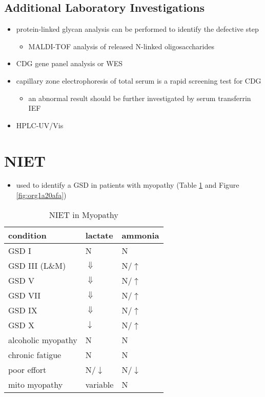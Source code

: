 \documentclass[12pt]{scrartcl}
\begin{document}
\subsection{Additional Laboratory Investigations}
\label{sec:org6fe397b}
\begin{itemize}
\item protein-linked glycan analysis can be performed to identify the defective step
\begin{itemize}
\item MALDI-TOF analysis of released N-linked oligosaccharides
\end{itemize}
\item CDG gene panel analysis or WES
\item capillary zone electrophoresis of total serum is a rapid screening
test for CDG
\begin{itemize}
\item an abnormal result should be further investigated by serum
transferrin IEF
\end{itemize}
\item HPLC-UV/Vis
\end{itemize}
\section{NIET}
\label{sec:orga6bddf5}
\begin{itemize}
\item used to identify a GSD in patients with myopathy (Table
\ref{tab:org55952ab} and Figure \ref{fig:org1a20afa})
\end{itemize}

\begin{table}[htbp]
\caption{\label{tab:org55952ab}NIET in Myopathy}
\centering
\begin{tabular}{lll}
condition & lactate & ammonia\\
\hline
GSD I & N & N\\
GSD III (L\&M) & \(\Downarrow\) & N/\(\uparrow\)\\
GSD V & \(\Downarrow\) & N/\(\uparrow\)\\
GSD VII & \(\Downarrow\) & N/\(\uparrow\)\\
GSD IX & \(\Downarrow\) & N/\(\uparrow\)\\
GSD X & \(\downarrow\) & N/\(\uparrow\)\\
alcoholic myopathy & N & N\\
chronic fatigue & N & N\\
poor effort & N/\(\downarrow\) & N/\(\downarrow\)\\
mito myopathy & variable & N\\
\end{tabular}
\end{table}
\end{document}
